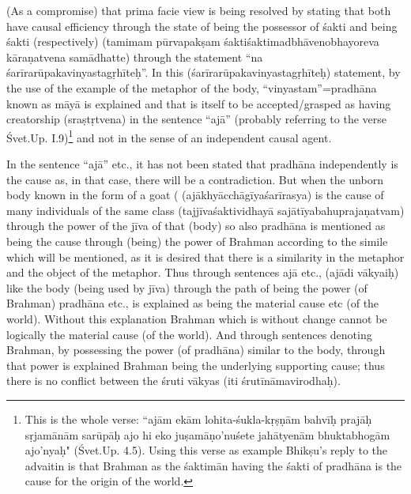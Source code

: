 (As a compromise) that prima facie view is being resolved by stating that both have causal efficiency through the state of being the possessor of śakti and being śakti (respectively) (tamimam pūrvapakṣam śaktiśaktimadbhāvenobhayoreva kāraṇatvena samādhatte)  through the statement “na śarīrarūpakavinyastagṛhīteḥ”.  In this (śarīrarūpakavin\-yastagṛhīteḥ) statement, by the use of the example of the metaphor of the body, “vinyastam”=pradhāna known as māyā is explained and that is itself to be accepted/grasped as having creatorship (sraṣtṛtvena) in the sentence “ajā” (probably referring to the verse Śvet.Up. I.9)\footnote{This is the whole verse: “ajām ekām lohita-śukla-kṛṣṇām bahvīḥ prajāḥ sṛjamānām sarūpāḥ ajo hi eko juṣamāṇo’nuśete jahātyenām bhuktabhogām ajo’nyaḥ" (Śvet.Up. 4.5).  Using this verse as example Bhikṣu’s reply to the advaitin is that Brahman as the śaktimān having the śakti of pradhāna is the cause for the origin of the world.} and not in the sense of an independent causal agent. 

\newpage

In the sentence “ajā” etc., it has not been stated that pradhāna independently is the cause as, in that case, there will be a contradiction. But when the unborn body known in the form of a goat ( (ajākhyācchāgīyaśarīrasya) is the cause of many individuals of the same class (tajjīvaśaktividhayā sajātīyabahuprajaṇatvam) through the power of the jīva of that (body) so also pradhāna is mentioned as being the cause through (being) the power of Brahman according to the simile which will be mentioned, as it is desired that there is a similarity in the metaphor and the object of  the metaphor. Thus through sentences ajā etc., (ajādi vākyaiḥ) like the body (being used by jīva) through the path of being the power (of Brahman) pradhāna etc., is explained as being the material cause etc (of the world). Without this explanation Brahman which is without change cannot be logically the material cause (of the world). And through sentences denoting Brahman, by possessing the power (of pradhāna) similar to the body, through that power is explained Brahman being the underlying supporting cause; thus there is no conflict between the śruti vākyas (iti śrutīnāmavirodhaḥ).


